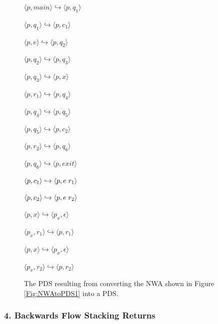 \begin{figure}[htbp]
  \centering
    \begin{description}
      \centering
      \item $\langle p,main \rangle \hookrightarrow \langle p,q_1 \rangle$
      \item $\langle p,q_1 \rangle \hookrightarrow \langle p,c_1 \rangle$
      \item $\langle p,e \rangle \hookrightarrow \langle p,q_2 \rangle$
      \item $\langle p,q_2 \rangle \hookrightarrow \langle p,q_3 \rangle$
      \item $\langle p,q_3 \rangle \hookrightarrow \langle p,x \rangle$
      \item $\langle p,r_1 \rangle \hookrightarrow \langle p,q_4 \rangle$
      \item $\langle p,q_4 \rangle \hookrightarrow \langle p,q_5 \rangle$
      \item $\langle p,q_5 \rangle \hookrightarrow \langle p,c_2 \rangle$
      \item $\langle p,r_2 \rangle \hookrightarrow \langle p,q_6 \rangle$
      \item $\langle p,q_6 \rangle \hookrightarrow \langle p,exit \rangle$
      \item $\langle p,c_1 \rangle \hookrightarrow \langle p,e \hspace{.1cm} r_1 \rangle$
      \item $\langle p,c_2 \rangle \hookrightarrow \langle p,e \hspace{.1cm} r_2 \rangle$
      \item $\langle p,x \rangle \hookrightarrow \langle p_x, \epsilon \rangle$
      \item $\langle p_x,r_1 \rangle \hookrightarrow \langle p,r_1 \rangle$
      \item $\langle p,x \rangle \hookrightarrow \langle p_x, \epsilon \rangle$
      \item $\langle p_x,r_2 \rangle \hookrightarrow \langle p,r_2 \rangle$
    \end{description}
  \caption{The PDS resulting from converting the NWA shown in Figure \ref{Fig:NWAtoPDS1} into a PDS.}
  \label{Fig:NWAtoPDS2}
\end{figure}

\subsubsection{4. Backwards Flow Stacking Returns}

